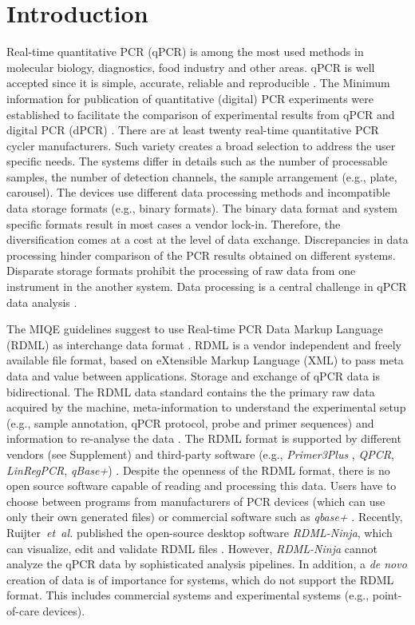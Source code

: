 \documentclass{bioinfo}
\begin{document}
\section{Introduction}
  Real-time quantitative PCR (qPCR) is among the most used methods in molecular 
biology, diagnostics, food industry and other areas. qPCR is well accepted since 
it is simple, accurate, reliable and reproducible \cite{pabinger_2014}. The 
Minimum information for publication of quantitative (digital) PCR experiments  
were established to facilitate the comparison of experimental results from qPCR 
and digital PCR (dPCR) \cite{huggett_2013}. There are at least twenty real-time 
quantitative PCR cycler manufacturers. Such variety creates a broad selection to 
address the user specific needs. The systems differ in details such as the 
number of processable samples, the number of detection channels, the sample 
arrangement (e.g., plate, carousel). The devices use different data processing 
methods and incompatible data storage formats (e.g.,  binary formats). The 
binary data format and system specific formats result in most cases a vendor 
lock-in. Therefore, the diversification comes at a cost at the level of data 
exchange. Discrepancies in data processing hinder comparison of the PCR results 
obtained on different systems. Disparate storage formats prohibit the processing 
of raw data from one instrument in the another system. Data processing is a 
central challenge in qPCR data analysis \cite{roediger2015r, 
spiess_impact_2014}.

The MIQE guidelines suggest to use 
Real-time PCR Data Markup Language (RDML) as interchange data format 
\cite{rdml-ninja_2015}. RDML is a vendor independent and freely available file 
format, based on eXtensible Markup Language (XML) to pass meta data and value 
between applications. Storage and exchange of qPCR data is bidirectional. The 
RDML data standard contains the the primary raw data acquired by the machine, 
meta-information to understand the experimental setup (e.g., sample annotation, 
qPCR protocol, probe and primer sequences) and information to re-analyse the 
data \cite{lefever_rdml_2009}. The RDML format is supported by different vendors 
(see Supplement) and third-party software (e.g., \textit{Primer3Plus} 
\cite{untergasser_2007}, \textit{QPCR}, \textit{LinRegPCR}, \textit{qBase+}) 
\cite{pabinger_2014, rdml-ninja_2015}. Despite the openness of the RDML format, 
there is no open source software capable of reading and processing this data. Users have to 
choose between programs from manufacturers of PCR devices (which can use only 
their own generated files) or commercial software such as \textit{qbase+} 
\cite{pabinger_2014, rdml-ninja_2015}. Recently, Ruijter~\textit{et~al.} 
published the open-source desktop software \textit{RDML-Ninja}, which can 
visualize, edit and validate RDML files \cite{rdml-ninja_2015}. However, 
\textit{RDML-Ninja} cannot analyze the qPCR data by sophisticated analysis 
pipelines. In addition, a \textit{de novo} creation of data is of importance for 
systems, which do not support the RDML format. This includes commercial systems 
and experimental systems (e.g.,  point-of-care devices). 
\end{document}
